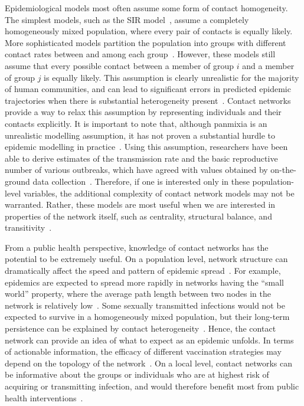 Epidemiological models most often assume some form of contact homogeneity. The
simplest models, such as the \gls{SIR} model~\autocite{anderson1992infectious},
assume a completely homogeneously mixed population, where every pair of
contacts is equally likely. More sophisticated models partition the population
into groups with different contact rates between and among each
group~\autocite{jacquez1988modeling}. However, these models still assume that
every possible contact between a member of group $i$ and a member of group $j$
is equally likely. This assumption is clearly unrealistic for the majority of
human communities, and can lead to significant errors in predicted epidemic
trajectories when there is substantial heterogeneity
present~\autocite{bansal2007individual, volz2007susceptible,
rolls2015simulation}. Contact networks provide a way to relax this assumption
by representing individuals and their contacts explicitly. It is important to
note that, although panmixia is an unrealistic modelling assumption, it has not
proven a substantial hurdle to epidemic modelling in
practice~\autocite{anderson1992infectious}. Using this assumption, researchers
have been able to derive estimates of the transmission rate and the basic
reproductive number of various outbreaks, which have agreed with values
obtained by on-the-ground data collection~\autocite{stadler2014insights}.
Therefore, if one is interested only in these population-level variables, the
additional complexity of contact network models may not be warranted. Rather,
these models are most useful when we are interested in properties of the
network itself, such as centrality, structural balance, and
transitivity~\autocite{wasserman1994social}.

From a public health perspective, knowledge of contact networks has the
potential to be extremely useful. On a population level, network structure can
dramatically affect the speed and pattern of epidemic
spread~\autocite[\eg][]{barthelemy2005dynamical, volz2008sir}. For example,
epidemics are expected to spread more rapidly in networks having the ``small
world'' property, where the average path length between two nodes in the
network is relatively low~\autocite{watts1998collective}. Some sexually
transmitted infections would not be expected to survive in a homogeneously
mixed population, but their long-term persistence can be explained by contact
heterogeneity~\autocite{anderson1992infectious, pastor2001epidemic}. Hence, the
contact network can provide an idea of what to expect as an epidemic unfolds.
In terms of actionable information, the efficacy of different vaccination
strategies may depend on the topology of the
network~\autocite{keeling2005networks,peng2013vaccination, ma2013importance,
rushmore2014network}. On a local level, contact networks can be informative
about the groups or individuals who are at highest risk of acquiring or
transmitting infection, and would therefore benefit most from public health
interventions~\autocite{wang2015targeting, little2014using}.

